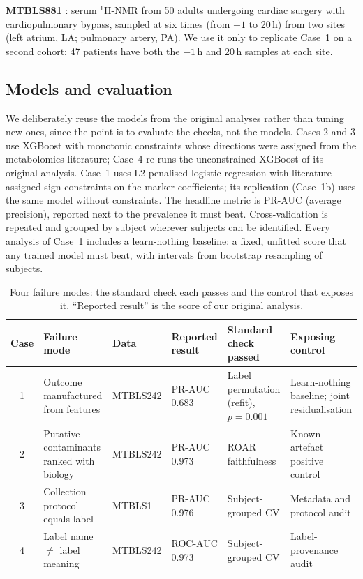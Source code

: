 \documentclass[conference]{IEEEtran}
\begin{document}
\textbf{MTBLS881} \cite{maltesen2020}: serum $^1$H-NMR from 50 adults
undergoing cardiac surgery with cardiopulmonary bypass, sampled at six times
(from $-1$ to 20\,h) from two sites (left atrium, LA; pulmonary artery, PA).
We use it only to replicate Case~1 on a second cohort: 47 patients have both
the $-1$\,h and 20\,h samples at each site.

\subsection{Models and evaluation}
We deliberately reuse the models from the original analyses rather than
tuning new ones, since the point is to evaluate the checks, not the models.
Cases 2 and 3 use XGBoost \cite{chen2016} with monotonic constraints whose
directions were assigned from the metabolomics literature; Case~4 re-runs the
unconstrained XGBoost of its original analysis. Case~1 uses
L2-penalised logistic regression with literature-assigned sign constraints
on the marker coefficients; its replication (Case~1b) uses the same model
without constraints. The headline metric is PR-AUC (average precision),
reported next to the prevalence it must beat. Cross-validation is repeated
and grouped by subject wherever subjects can be identified. Every analysis of
Case~1 includes a learn-nothing baseline: a fixed, unfitted score that any
trained model must beat, with intervals from bootstrap resampling of
subjects.

\begin{table}[t]
\centering
\caption{Four failure modes: the standard check each passes and the control
that exposes it. ``Reported result'' is the score of our original analysis.}
\label{tab:taxonomy}
\footnotesize
\begin{tabular}{@{}c p{3.4cm} l l p{3.2cm} p{3.2cm}@{}}
\toprule
Case & Failure mode & Data & Reported result & Standard check passed & Exposing control \\
\midrule
1 & Outcome manufactured from features & MTBLS242 & PR-AUC 0.683 & Label permutation (refit), $p=0.001$ & Learn-nothing baseline; joint residualisation \\
2 & Putative contaminants ranked with biology & MTBLS242 & PR-AUC 0.973 & ROAR faithfulness & Known-artefact positive control \\
3 & Collection protocol equals label & MTBLS1 & PR-AUC 0.976 & Subject-grouped CV & Metadata and protocol audit \\
4 & Label name $\neq$ label meaning & MTBLS242 & ROC-AUC 0.973 & Subject-grouped CV & Label-provenance audit \\
\bottomrule
\end{tabular}
\end{table}
\end{document}
